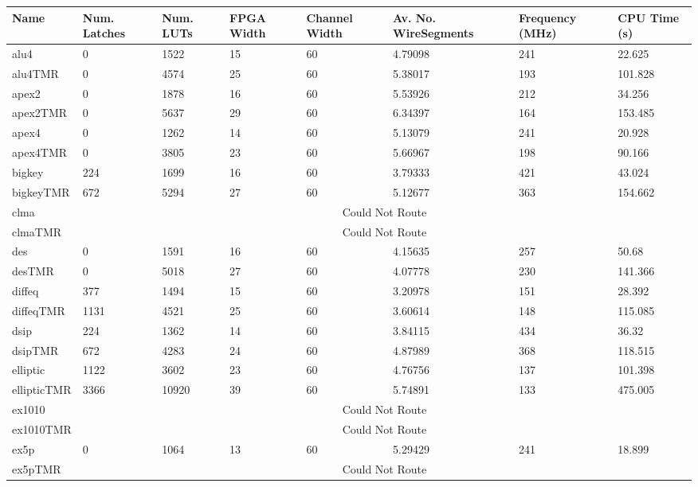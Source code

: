 \documentclass[12pt,final,oneside]{dwThesis} %
\begin{document}
\begin{table}
\footnotesize
\begin{adjustwidth}{-1cm}{-1.2cm}
    \begin{tabularx}{1.1\textwidth}{llllp{1.5cm}p{2.2cm}p{1.5cm}X}
    \toprule
Name & Num. Latches & Num. LUTs & FPGA Width & Channel Width & Av. No. Wire\newline Segments & Frequency (MHz) & CPU Time (s)\\\midrule
alu4 & 0 & 1522 & 15 & 60 & 4.79098 & 241 & 22.625\\
alu4TMR & 0 & 4574 & 25 & 60 & 5.38017 & 193 & 101.828\\\midrule
apex2 & 0 & 1878 & 16 & 60 & 5.53926 & 212 & 34.256\\
apex2TMR & 0 & 5637 & 29 & 60 & 6.34397 & 164 & 153.485\\\midrule
apex4 & 0 & 1262 & 14 & 60 & 5.13079 & 241 & 20.928\\
apex4TMR & 0 & 3805 & 23 & 60 & 5.66967 & 198 & 90.166\\\midrule
bigkey & 224 & 1699 & 16 & 60 & 3.79333 & 421 & 43.024\\
bigkeyTMR & 672 & 5294 & 27 & 60 & 5.12677 & 363 & 154.662\\\midrule
clma & \multicolumn{7}{c}{Could Not Route}\\
clmaTMR & \multicolumn{7}{c}{Could Not Route}\\\midrule
des & 0 & 1591 & 16 & 60 & 4.15635 & 257 & 50.68\\
desTMR & 0 & 5018 & 27 & 60 & 4.07778 & 230 & 141.366\\\midrule
diffeq & 377 & 1494 & 15 & 60 & 3.20978 & 151 & 28.392\\
diffeqTMR & 1131 & 4521 & 25 & 60 & 3.60614 & 148 & 115.085\\\midrule
dsip & 224 & 1362 & 14 & 60 & 3.84115 & 434 & 36.32\\
dsipTMR & 672 & 4283 & 24 & 60 & 4.87989 & 368 & 118.515\\\midrule
elliptic & 1122 & 3602 & 23 & 60 & 4.76756 & 137 & 101.398\\
ellipticTMR & 3366 & 10920 & 39 & 60 & 5.74891 & 133 & 475.005\\\midrule
ex1010 & \multicolumn{7}{c}{Could Not Route}\\
ex1010TMR & \multicolumn{7}{c}{Could Not Route}\\\midrule
ex5p & 0 & 1064 & 13 & 60 & 5.29429 & 241 & 18.899\\
ex5pTMR & \multicolumn{7}{c}{Could Not Route}\\\midrule

\end{tabularx}
\end{adjustwidth}
\end{table}
\end{document}

